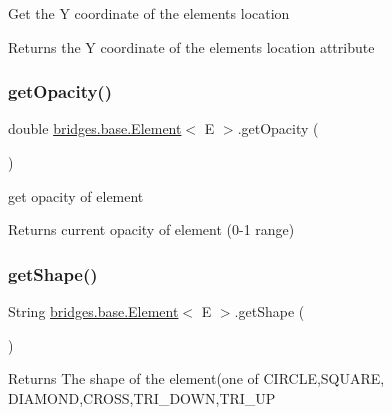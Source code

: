 Get the Y coordinate of the element\textquotesingle{}s location \begin{DoxyReturn}{Returns}
the Y coordinate of the element\textquotesingle{}s location attribute 
\end{DoxyReturn}
\mbox{\label{classbridges_1_1base_1_1_element_a1427af7efc2d5bc93e00a6a95d268c4d}} 
\subsubsection{\texorpdfstring{get\+Opacity()}{getOpacity()}}
{\footnotesize\ttfamily double \hyperlink{classbridges_1_1base_1_1_element}{bridges.\+base.\+Element}$<$ E $>$.get\+Opacity (\begin{DoxyParamCaption}{ }\end{DoxyParamCaption})}

get opacity of element

\begin{DoxyReturn}{Returns}
current opacity of element (0-\/1 range) 
\end{DoxyReturn}
\mbox{\label{classbridges_1_1base_1_1_element_aa0fe02d2f5491cf21cc6741f592536a8}} 
\subsubsection{\texorpdfstring{get\+Shape()}{getShape()}}
{\footnotesize\ttfamily String \hyperlink{classbridges_1_1base_1_1_element}{bridges.\+base.\+Element}$<$ E $>$.get\+Shape (\begin{DoxyParamCaption}{ }\end{DoxyParamCaption})}

\begin{DoxyReturn}{Returns}
The shape of the element(one of C\+I\+R\+C\+LE,S\+Q\+U\+A\+RE, D\+I\+A\+M\+O\+ND,C\+R\+O\+SS,T\+R\+I\+\_\+\+D\+O\+WN,T\+R\+I\+\_\+\+UP 
\end{DoxyReturn}
\mbox{\label{classbridges_1_1base_1_1_element_add4b836e041e45e0c7a80eb7fd5a229d}} 
